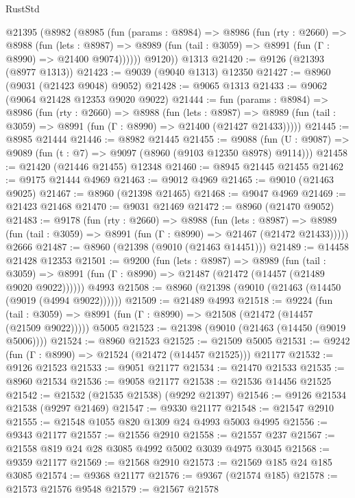 \begin{lexlean}{RustStd}
\begin{coremodule}
    @21395
      (@8982
        (@8985
          (fun (params : @8984) =>
          @8986
            (fun (rty : @2660) =>
            @8988
              (fun (lets : @8987) =>
              @8989 (fun (tail : @3059) => @8991 (fun (Γ : @8990) => @21400 @9074))))))
        @9120))
    @1313
@21420 := @9126 (@21393 (@8977 @1313))
@21423 := @9039 (@9040 @1313) @12350
@21427 := @8960 (@9031 (@21423 @9048) @9052)
@21428 := @9065 @1313
@21433 := @9062 (@9064 @21428 @12353 @9020 @9022)
@21444 := fun (params : @8984) =>
  @8986
    (fun (rty : @2660) =>
    @8988
      (fun (lets : @8987) =>
      @8989 (fun (tail : @3059) => @8991 (fun (Γ : @8990) => @21400 (@21427 @21433)))))
@21445 := @8985 @21444
@21446 := @8982 @21445
@21455 := @9088
    (fun (U : @9087) => @9089 (fun (t : @7) => @9097 (@8960 (@9103 @12350 @8978) @9114)))
@21458 := @21420 (@21446 @21455) @12348
@21460 := @8945 @21445 @21455
@21462 := @9175 @21444 @4969
@21463 := @9012 @4969
@21465 := @9010 (@21463 @9025)
@21467 := @8960 (@21398 @21465)
@21468 := @9047 @4969
@21469 := @21423 @21468
@21470 := @9031 @21469
@21472 := @8960 (@21470 @9052)
@21483 := @9178
    (fun (rty : @2660) =>
    @8988
      (fun (lets : @8987) =>
      @8989 (fun (tail : @3059) => @8991 (fun (Γ : @8990) => @21467 (@21472 @21433)))))
    @2666
@21487 := @8960 (@21398 (@9010 (@21463 @14451)))
@21489 := @14458 @21428 @12353
@21501 := @9200
    (fun (lets : @8987) =>
    @8989
      (fun (tail : @3059) =>
      @8991 (fun (Γ : @8990) => @21487 (@21472 (@14457 (@21489 @9020 @9022))))))
    @4993
@21508 := @8960 (@21398 (@9010 (@21463 (@14450 (@9019 (@4994 @9022))))))
@21509 := @21489 @4993
@21518 := @9224
    (fun (tail : @3059) => @8991 (fun (Γ : @8990) => @21508 (@21472 (@14457 (@21509 @9022)))))
    @5005
@21523 := @21398 (@9010 (@21463 (@14450 (@9019 @5006))))
@21524 := @8960 @21523
@21525 := @21509 @5005
@21531 := @9242 (fun (Γ : @8990) => @21524 (@21472 (@14457 @21525))) @21177
@21532 := @9126 @21523
@21533 := @9051 @21177
@21534 := @21470 @21533
@21535 := @8960 @21534
@21536 := @9058 @21177
@21538 := @21536 @14456 @21525
@21542 := @21532 (@21535 @21538) (@9292 @21397)
@21546 := @9126 @21534 @21538 (@9297 @21469)
@21547 := @9330 @21177
@21548 := @21547 @2910
@21555 := @21548 @1055 @820 @1309 @24 @4993 @5003 @4995
@21556 := @9343 @21177
@21557 := @21556 @2910
@21558 := @21557 @237
@21567 := @21558 @819 @24 @28 @3085 @4992 @5002 @3039 @4975 @3045
@21568 := @9359 @21177
@21569 := @21568 @2910
@21573 := @21569 @185 @24 @185 @3085
@21574 := @9368 @21177
@21576 := @9367 (@21574 @185)
@21578 := @21573 @21576 @9548
@21579 := @21567 @21578

\end{coremodule}
\end{lexlean}
